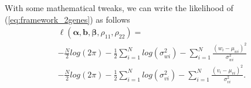 \documentclass[aoas,preprint]{imsart}
\numberwithin{equation}{section}
\theoremstyle{plain}
\begin{document}
With some mathematical tweaks, we can write the likelihood of (\ref{eq:framework_2genes}) as follows
\begin{equation}
\begin{multlined}
\ell(\bm{\alpha}, \bm{b}, \bm{\beta}, \rho_{11}, \rho_{22}) = \\
-\frac{N}{2} log(2\pi) - \frac{1}{2} \sum_{i=1}^{N} log (\sigma_{wi}^2) - \sum_{i=1}^{N} \frac{(w_i - \mu_{wi})^2}{\sigma_{wi}^2}\\
-\frac{N}{2} log(2\pi) - \frac{1}{2} \sum_{i=1}^{N} log (\sigma_{vi}^2) - \sum_{i=1}^{N} \frac{(v_i - \mu_{vi})^2}{\sigma_{vi}^2}.
\end{multlined}
    \label{eq:likelihood_2genes}
\end{equation}
\end{document}
